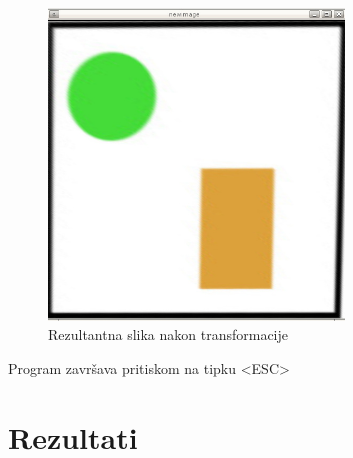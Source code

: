 \begin{figure}[ht]
	\centering
	\includegraphics[width=0.7\textwidth]{figures/transformedImage.jpg}
	\caption{Rezultantna slika nakon transformacije}
	\label{fig:transformiranaSlika}
\end{figure}

Program završava pritiskom na tipku <ESC>

\section{Rezultati}
\label{sec:rezultati}